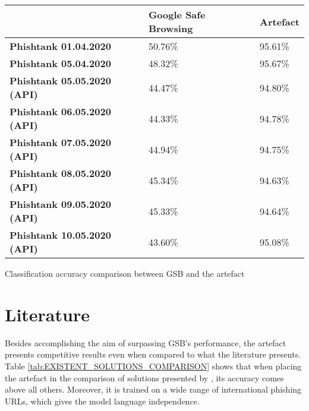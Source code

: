 \begin{singlespace}
	\begin{center}
		\label{tab:ARTEFACT_VS_GSB}
		\begin{tabular}{  m{16em}  m{12em}  m{7em} } \toprule

			                                    & \textbf{Google Safe Browsing} & \textbf{Artefact} \\ \midrule

			\textbf{Phishtank 01.04.2020}       & 50.76\%                       & 95.61\%           \\

			\textbf{Phishtank 05.04.2020}       & 48.32\%                       & 95.67\%           \\

			\textbf{Phishtank 05.05.2020 (API)} & 44.47\%                       & 94.80\%           \\

			\textbf{Phishtank 06.05.2020 (API)} & 44.33\%                       & 94.78\%           \\

			\textbf{Phishtank 07.05.2020 (API)} & 44.94\%                       & 94.75\%           \\

			\textbf{Phishtank 08.05.2020 (API)} & 45.34\%                       & 94.63\%           \\

			\textbf{Phishtank 09.05.2020 (API)} & 45.33\%                       & 94.64\%           \\

			\textbf{Phishtank 10.05.2020 (API)} & 43.60\%                       & 95.08\%           \\ \bottomrule
		\end{tabular}
		\captionsetup{type=table}\caption{Classification accuracy comparison between GSB and the artefact}
	\end{center}
\end{singlespace}

\section{Literature}
Besides accomplishing the aim of surpassing GSB's performance, the artefact presents competitive results even when compared to what the literature presents. Table \ref{tab:EXISTENT_SOLUTIONS_COMPARISON} shows that when placing the artefact in the comparison of solutions presented by \cite{Adebowale}, its accuracy comes above all others. Moreover, it is trained on a wide range of international phishing URLs, which gives the model language independence.

